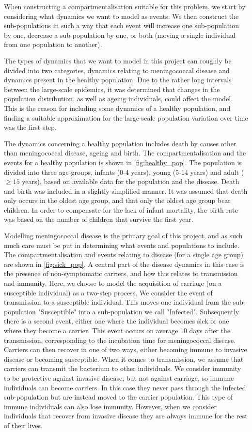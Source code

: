 \documentclass[10pt,a4paper]{article}
\begin{document}
When constructing a compartmentalisation suitable for this problem, we start by considering what dynamics we want to model as events. We then construct the sub-populations in such a way that each event will increase one sub-population by one, decrease a sub-population by one, or both (moving a single individual from one population to another).

The types of dynamics that we want to model in this project can roughly be divided into two categories, dynamics relating to meningococcal disease and dynamics present in the healthy population. Due to the rather long intervals between the large-scale epidemics, it was determined that changes in the population distribution, as well as ageing individuals, could affect the model. This is the reason for including some dynamics of a healthy population, and finding a suitable approximation for the large-scale population variation over time was the first step.

The dynamics concerning a healthy population includes death by causes other than meningococcal disease, ageing and birth. The compartmentalisation and the events for a healthy population is shown in \cref{fig:healthy_pop}. The population is divided into three age groups, infants (0-4 years), young (5-14 years) and adult ($\geq15$ years), based on available data for the population and the disease. Death and birth was included in a slightly simplified manner. It was assumed that death only occurs in the oldest age group, and that only the oldest age group bear children. In order to compensate for the lack of infant mortality, the birth rate was based on the number of children that survive the first year.

Modelling meningococcal disease is the primary goal of this project, and as such much care must be put in determining what events and populations to include. The compartmentalisation and events relating to disease (for a single age group) are shown in \cref{fig:sick_pop}. A central part of the disease dynamics in this case is the presence of non-symptomatic carriers, and how this relates to transmission and immunity. Here, we choose to model the acquisition of carriage (on a susceptible individual) as a two-step process. We consider the event of transmission to a susceptible individual. This moves one individual from the sub-population "Susceptible" into a sub-population we call "Infected". Subsequently there is a second event, either one where the individual  becomes sick or one where they become a carrier. This event occurs on average 10 days after the transmission, corresponding to the incubation time for meningococcal disease. Carriers can then recover in one of two ways, either becoming immune to invasive disease or becoming susceptible. When it comes to transmission, we assume that carriers can transmit the bacterium to other individuals. We consider immunity to be protective against invasive disease, but not against carriage, so immune individuals can become carriers. In this case they never pass through the infected sub-population but are instead moved to the carrier population. This type of immune individuals can also lose immunity. However, when we consider individuals that recover from invasive disease they are always immune for the rest of their lives.
\end{document}
